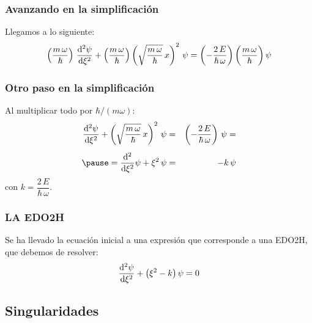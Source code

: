 \documentclass[12pt]{beamer}
\begin{document}
\begin{frame}
\frametitle{Avanzando en la simplificación}
Llegamos a lo siguiente:
\begin{align*}
\left( \dfrac{m \, \omega}{\hbar} \right) \, \dv[2]{\psi}{\xi} + \left( \dfrac{m \, \omega}{\hbar} \right) \left( \sqrt{\dfrac{m \, \omega}{\hbar}} \, x \right)^{2} \, \psi = \left( - \dfrac{2 \, E}{\hbar \, \omega} \right) \bigg( \dfrac{m \, \omega}{\hbar} \bigg) \, \psi
\end{align*}
\end{frame}
\begin{frame}
\frametitle{Otro paso en la simplificación}
Al multiplicar todo por $\hbar / (m \omega)$:
\pause
\begin{eqnarray*}
\dv[2]{\psi}{\xi} + \left( \sqrt{\dfrac{m \, \omega}{\hbar}} \, x \right)^{2} \, \psi &=& \left( - \dfrac{2 \, E}{\hbar \, \omega} \right) \, \psi = \\[0.5em] \pause
= \dv[2]{\xi} \psi + \xi^{2} \, \psi &=& - k \, \psi
\end{eqnarray*}
\pause
con $k = \dfrac{2 \, E}{\hbar \, \omega}$.
\end{frame}
\begin{frame}
\frametitle{LA EDO2H}
Se ha llevado la ecuación inicial a una expresión que corresponde a una EDO2H, que debemos de resolver:
\pause
\begin{align}
\dv[2]{\psi}{\xi} + \big( \xi^{2} - k \big) \, \psi = 0
\label{eq:ED_oscilador}
\end{align}
\end{frame}

\subsection{Singularidades}
\end{document}
